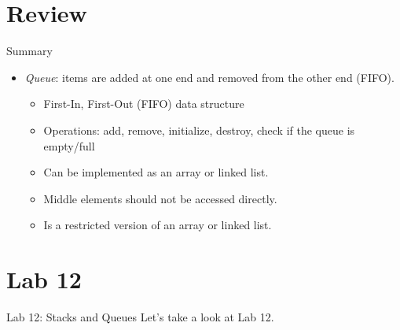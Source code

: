 \documentclass[14pt,aspectratio=1610]{beamer}
\begin{document}
\section{Review}

\begin{frame}{Summary}
\begin{itemize}
\item
  \emph{Queue}: items are added at one end and removed from the other end (FIFO).
  \begin{itemize}
  \item
    First-In, First-Out (FIFO) data structure
  \item
    Operations: add, remove, initialize, destroy, check if the queue is empty/full
  \item
    Can be implemented as an array or linked list.
  \item
    Middle elements should not be accessed directly.
  \item
    Is a restricted version of an array or linked list.
  \end{itemize}
\end{itemize}
\end{frame}


\section*{Lab 12}
\begin{frame}{Lab 12: Stacks and Queues}
\centering\Large
  Let's take a look at Lab 12.
\end{frame}
\end{document}
